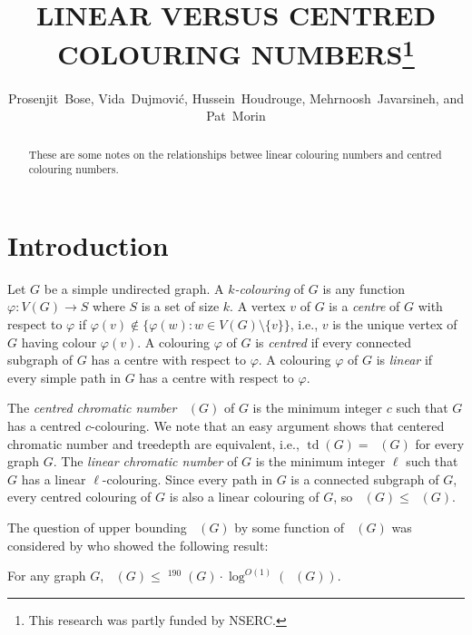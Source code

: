 \documentclass{patmorin}
\title{\MakeUppercase{Linear versus centred Colouring Numbers}\thanks{This research was partly funded by NSERC.}}
\author{Prosenjit~Bose, Vida~Dujmović, Hussein~Houdrouge, Mehrnoosh~Javarsineh, and Pat~Morin}
\date{}
\DeclareMathOperator{\td}{td}
\DeclareMathOperator{\chicen}{\chi_{\mathrm{cen}}}
\DeclareMathOperator{\chilin}{\chi_{\mathrm{lin}}}
\begin{document}
\maketitle
\renewcommand{\E}{\mathbb{E}}
\renewcommand{\Pr}{\mathbb{P}}

\begin{abstract}
    These are some notes on the relationships betwee linear colouring numbers and centred colouring numbers.
\end{abstract}

\section{Introduction}

Let $G$ be a simple undirected graph.  A \emph{$k$-colouring} of $G$ is any function $\varphi:V(G)\to S$ where $S$ is a set of size $k$.  A vertex $v$ of $G$ is a \emph{centre} of $G$ with respect to $\varphi$ if $\varphi(v)\not\in\{\varphi(w):w\in V(G)\setminus\{v\}\}$, i.e., $v$ is the unique vertex of $G$ having colour $\varphi(v)$.  A colouring $\varphi$ of $G$ is \emph{centred} if every connected subgraph of $G$ has a centre with respect to $\varphi$. A colouring $\varphi$ of $G$ is \emph{linear} if every simple path in $G$ has a centre with respect to $\varphi$.

The \emph{centred chromatic number} $\chicen(G)$ of $G$ is the minimum integer $c$ such that $G$ has a centred $c$-colouring.  We note that an easy argument shows that centered chromatic number and treedepth are equivalent, i.e., $\td(G)=\chicen(G)$ for every graph $G$. The \emph{linear chromatic number} of $G$ is the minimum integer $\ell$ such that $G$ has a linear $\ell$-colouring.  Since every path in $G$ is a connected subgraph of $G$, every centred colouring of $G$ is also a linear colouring of $G$, so $\chilin(G)\le\chicen(G)$.

The question of upper bounding $\chicen(G)$ by some function of $\chilin(G)$ was considered by \citet[Theorem~1]{kun.obrien.ea:polynomial} who showed the following result:

\begin{thm}\label{kun_obrien_general}
  For any graph $G$, $\chicen(G)\le \chilin^{190}(G)\cdot\log^{O(1)}(\chilin(G))$.
\end{thm}
\end{document}
